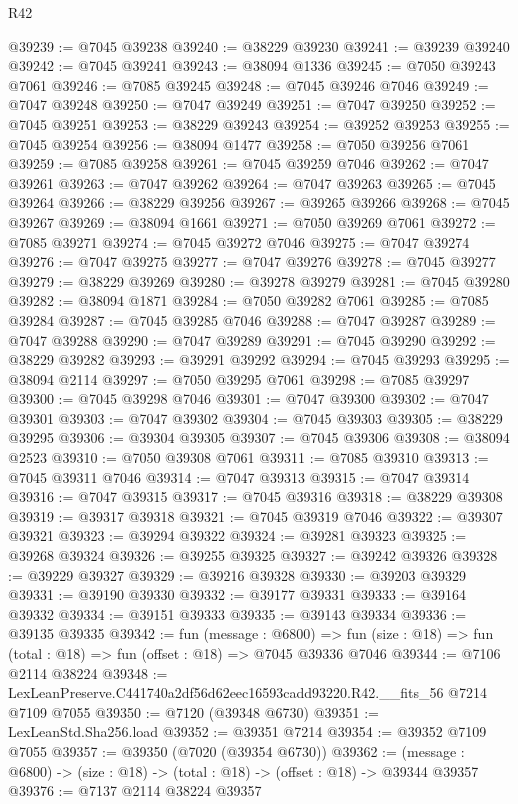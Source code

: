 \begin{lexlean}{R42}
\begin{coremodule}
{@39239 := @7045 @39238
@39240 := @38229 @39230
@39241 := @39239 @39240
@39242 := @7045 @39241
@39243 := @38094 @1336
@39245 := @7050 @39243 @7061
@39246 := @7085 @39245
@39248 := @7045 @39246 @7046
@39249 := @7047 @39248
@39250 := @7047 @39249
@39251 := @7047 @39250
@39252 := @7045 @39251
@39253 := @38229 @39243
@39254 := @39252 @39253
@39255 := @7045 @39254
@39256 := @38094 @1477
@39258 := @7050 @39256 @7061
@39259 := @7085 @39258
@39261 := @7045 @39259 @7046
@39262 := @7047 @39261
@39263 := @7047 @39262
@39264 := @7047 @39263
@39265 := @7045 @39264
@39266 := @38229 @39256
@39267 := @39265 @39266
@39268 := @7045 @39267
@39269 := @38094 @1661
@39271 := @7050 @39269 @7061
@39272 := @7085 @39271
@39274 := @7045 @39272 @7046
@39275 := @7047 @39274
@39276 := @7047 @39275
@39277 := @7047 @39276
@39278 := @7045 @39277
@39279 := @38229 @39269
@39280 := @39278 @39279
@39281 := @7045 @39280
@39282 := @38094 @1871
@39284 := @7050 @39282 @7061
@39285 := @7085 @39284
@39287 := @7045 @39285 @7046
@39288 := @7047 @39287
@39289 := @7047 @39288
@39290 := @7047 @39289
@39291 := @7045 @39290
@39292 := @38229 @39282
@39293 := @39291 @39292
@39294 := @7045 @39293
@39295 := @38094 @2114
@39297 := @7050 @39295 @7061
@39298 := @7085 @39297
@39300 := @7045 @39298 @7046
@39301 := @7047 @39300
@39302 := @7047 @39301
@39303 := @7047 @39302
@39304 := @7045 @39303
@39305 := @38229 @39295
@39306 := @39304 @39305
@39307 := @7045 @39306
@39308 := @38094 @2523
@39310 := @7050 @39308 @7061
@39311 := @7085 @39310
@39313 := @7045 @39311 @7046
@39314 := @7047 @39313
@39315 := @7047 @39314
@39316 := @7047 @39315
@39317 := @7045 @39316
@39318 := @38229 @39308
@39319 := @39317 @39318
@39321 := @7045 @39319 @7046
@39322 := @39307 @39321
@39323 := @39294 @39322
@39324 := @39281 @39323
@39325 := @39268 @39324
@39326 := @39255 @39325
@39327 := @39242 @39326
@39328 := @39229 @39327
@39329 := @39216 @39328
@39330 := @39203 @39329
@39331 := @39190 @39330
@39332 := @39177 @39331
@39333 := @39164 @39332
@39334 := @39151 @39333
@39335 := @39143 @39334
@39336 := @39135 @39335
@39342 := fun (message : @6800) =>
  fun (size : @18) => fun (total : @18) => fun (offset : @18) => @7045 @39336 @7046
@39344 := @7106 @2114 @38224
@39348 := LexLeanPreserve.C441740a2df56d62eec16593cadd93220.R42.__fits_56 @7214 @7109 @7055
@39350 := @7120 (@39348 @6730)
@39351 := LexLeanStd.Sha256.load
@39352 := @39351 @7214
@39354 := @39352 @7109 @7055
@39357 := @39350 (@7020 (@39354 @6730))
@39362 := (message : @6800) -> (size : @18) -> (total : @18) -> (offset : @18) -> @39344 @39357
@39376 := @7137
    @2114
    @38224
    @39357
}
\end{coremodule}
\end{lexlean}

